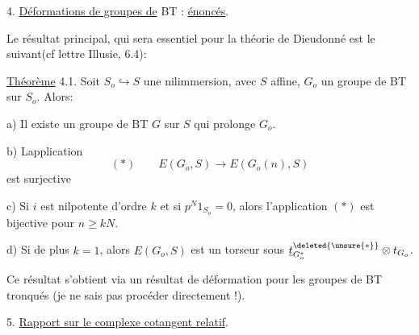 4.  \uline{Déformations de groupes de} BT : \uline{énoncés}.

Le résultat principal, qui sera essentiel pour la théorie de Dieudonné est le suivant(cf lettre Illusie, 6.4):

\uline{Théorème} 4.1. Soit $S_o\hookrightarrow S$ une nilimmersion, avec $S$ affine, $G_o$ un groupe de BT sur $S_o$. Alors:

a) Il existe un groupe de BT $G$ sur $S$ qui prolonge $G_o$.

b) Lapplication
\[
(*)\qquad E(G_o,S)\longrightarrow E(G_o(n),S)
\]
est surjective

c) Si $i$ est nilpotente d'ordre $k$ et si $p^N1_{S_o}=0$, alors l'application $(*)$ est bijective pour $n\geq kN$.

d) Si de plus $k=1$, alors $E(G_o,S)$ est un torseur sous $\underline t^{\deleted{\unsure{*}}}_{G_o^*}\otimes t_{G_o}$.

Ce résultat s'obtient via un résultat de déformation pour les groupes de BT tronqués (je ne sais pas procéder directement !).

5. \uline{Rapport sur le complexe cotangent relatif}.
